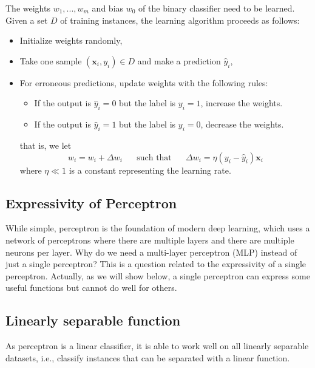 The weights $w_1,...,w_m$ and bias $w_0$ of the binary classifier need to be learned. Given a set $D$ of training instances, the learning algorithm proceeds as follows: 

\begin{itemize}
    \item Initialize weights randomly,
    \item Take one sample $(\textbf{x}_i,y_i)\in D$ and make a prediction ${\hat y}_i$,  
    \item For erroneous predictions,  update weights with the following rules: 
    \begin{itemize}
        \item If the output is ${\hat y}_i=0$ but the label is $y_i=1$, increase the weights. 
       
        \item If the output is ${\hat y}_i=1$ but the label is $y_i=0$, decrease the weights.
    \end{itemize}
    that is, we let 
     \begin{equation}
            w_i=w_i+\Delta w_i \text{~~~~ such that ~~~~} \Delta w_i = \eta(y_i-{\hat y}_i) \textbf{x}_i
        \end{equation}
    where $\eta \ll 1$ is a constant representing the learning rate.
\end{itemize}

\subsection{Expressivity of Perceptron}\label{sec:perceptronexpressivity}

While simple, perceptron is the foundation of modern deep learning, which  uses a network of perceptrons where there are multiple layers and there are multiple neurons per layer.  
%
Why do we need a multi-layer perceptron (MLP) instead of just a single perceptron? This is a question related to the expressivity of a single perceptron. Actually, as we will show below, a single perceptron can express some useful functions but cannot do well for others. 

\subsection*{Linearly separable function} 

As perceptron is a linear classifier, it is able to work well on all linearly separable datasets, i.e., classify instances that can be separated with a linear function. 

